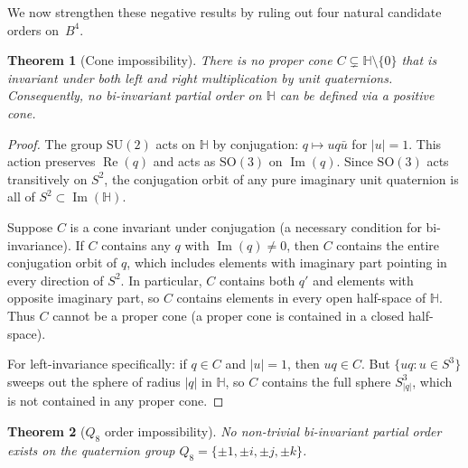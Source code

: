 \documentclass[11pt,a4paper]{article}
\newtheorem{theorem}{Theorem}
\newcommand{\SU}{\mathrm{SU}(2)}
\newcommand{\Real}{\operatorname{Re}}
\newcommand{\Imag}{\operatorname{Im}}
\newcommand{\Hq}{\mathbb{H}}
\begin{document}
We now strengthen these negative results by ruling out four natural
candidate orders on~$B^4$.

\begin{theorem}[Cone impossibility]
\label{thm:cone-impossibility}
There is no proper cone $C \subsetneq \Hq \setminus \{0\}$ that is
invariant under both left and right multiplication by unit quaternions.
Consequently, no bi-invariant partial order on $\Hq$ can be defined via
a positive cone.
\end{theorem}

\begin{proof}
The group $\SU$ acts on $\Hq$ by conjugation: $q \mapsto uq\bar{u}$
for $|u| = 1$. This action preserves $\Real(q)$ and acts as $\mathrm{SO}(3)$
on $\Imag(q)$. Since $\mathrm{SO}(3)$ acts transitively on $S^2$,
the conjugation orbit of any pure imaginary unit quaternion is all of
$S^2 \subset \Imag(\Hq)$.

Suppose $C$ is a cone invariant under conjugation (a necessary
condition for bi-invariance). If $C$ contains any $q$ with
$\Imag(q) \neq 0$, then $C$ contains the entire conjugation orbit of
$q$, which includes elements with imaginary part pointing in every
direction of $S^2$. In particular, $C$ contains both $q'$ and elements
with opposite imaginary part, so $C$ contains elements in every open
half-space of $\Hq$. Thus $C$ cannot be a proper cone (a proper cone
is contained in a closed half-space).

For left-invariance specifically: if $q \in C$ and $|u| = 1$, then
$uq \in C$. But $\{uq : u \in S^3\}$ sweeps out the sphere of radius
$|q|$ in $\Hq$, so $C$ contains the full sphere $S^3_{|q|}$, which is
not contained in any proper cone.
\end{proof}

\begin{theorem}[$Q_8$ order impossibility]
\label{thm:q8-impossibility}
No non-trivial bi-invariant partial order exists on the quaternion
group $Q_8 = \{\pm 1, \pm i, \pm j, \pm k\}$.
\end{theorem}
\end{document}
